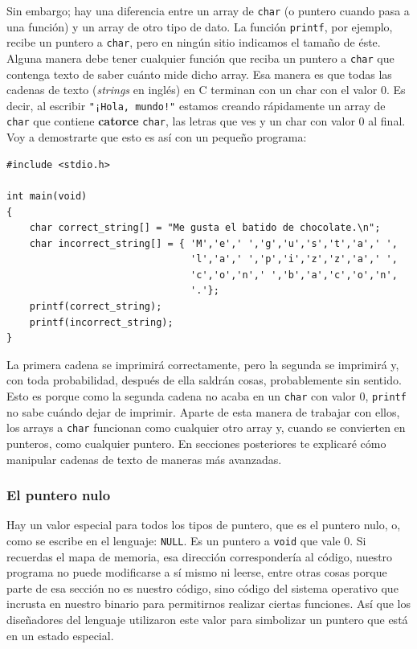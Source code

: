 \documentclass[a4paper]{article}
\begin{document}
Sin embargo; hay una diferencia entre un array de \verb!char! (o puntero cuando
pasa a una
función) y un array de otro tipo de dato. La función \verb!printf!, por ejemplo,
recibe un puntero a \verb!char!, pero en ningún sitio indicamos el tamaño de
éste. Alguna manera debe tener cualquier función que reciba un puntero a
\texttt{char}
que contenga texto de saber cuánto mide dicho array. Esa manera es que todas
las cadenas de texto (\textit{strings} en inglés) en C terminan con un char
con el valor 0. Es decir, al escribir \verb|"¡Hola, mundo!"| estamos creando
rápidamente un array de \verb!char! que contiene \textbf{catorce} \verb!char!,
las letras que ves y un char con valor 0 al final. Voy a demostrarte que
esto es así con un pequeño programa:

\noindent
\begin{minipage}[H]{\linewidth}
\mbox{}
\begin{lstlisting}[style=C, label={lst:sizeofArraysPointers}, caption={Arrays de char}]
#include <stdio.h>

int main(void)
{
    char correct_string[] = "Me gusta el batido de chocolate.\n";
    char incorrect_string[] = { 'M','e',' ','g','u','s','t','a',' ',
                                'l','a',' ','p','i','z','z','a',' ',
                                'c','o','n',' ','b','a','c','o','n',
                                '.'};
    printf(correct_string);
    printf(incorrect_string);
}
\end{lstlisting}
\end{minipage}

La primera cadena se imprimirá correctamente, pero la segunda se imprimirá y,
con toda probabilidad, después de ella saldrán cosas, probablemente sin sentido.
Esto es porque como la segunda cadena no acaba en un \verb!char! con valor 0,
\verb!printf! no sabe cuándo dejar de imprimir. Aparte de esta manera de
trabajar con ellos, los arrays a \verb!char! funcionan como cualquier otro array
y, cuando se convierten en punteros, como cualquier puntero. En secciones
posteriores te explicaré cómo manipular cadenas de texto de maneras más
avanzadas.

\subsubsection{El puntero nulo}
Hay un valor especial para todos los tipos de puntero, que es el puntero nulo,
o, como se escribe en el lenguaje: \verb!NULL!. Es un puntero a \verb!void! que
vale 0. Si recuerdas el mapa de memoria, esa dirección correspondería al código,
nuestro programa no puede modificarse a sí mismo ni leerse, entre otras cosas
porque parte de esa sección no es nuestro código, sino código del sistema
operativo que incrusta en nuestro binario para permitirnos realizar ciertas
funciones. Así que los diseñadores del lenguaje utilizaron este valor para
simbolizar un puntero que está en un estado especial.
\end{document}
